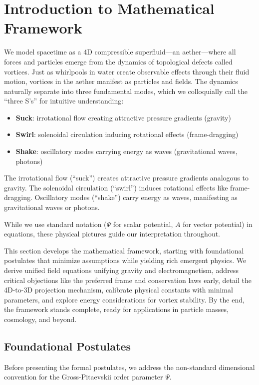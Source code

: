 \section{Introduction to Mathematical Framework}

We model spacetime as a 4D compressible superfluid---an aether---where all forces and particles emerge from the dynamics of topological defects called vortices. Just as whirlpools in water create observable effects through their fluid motion, vortices in the aether manifest as particles and fields. The dynamics naturally separate into three fundamental modes, which we colloquially call the ``three S's'' for intuitive understanding:
\begin{itemize}
\item \textbf{Suck}: irrotational flow creating attractive pressure gradients (gravity)
\item \textbf{Swirl}: solenoidal circulation inducing rotational effects (frame-dragging)
\item \textbf{Shake}: oscillatory modes carrying energy as waves (gravitational waves, photons)
\end{itemize}
The irrotational flow (``suck'') creates attractive pressure gradients analogous to gravity. The solenoidal circulation (``swirl'') induces rotational effects like frame-dragging. Oscillatory modes (``shake'') carry energy as waves, manifesting as gravitational waves or photons.

While we use standard notation ($\Psi$ for scalar potential, $A$ for vector potential) in equations, these physical pictures guide our interpretation throughout.

This section develops the mathematical framework, starting with foundational postulates that minimize assumptions while yielding rich emergent physics. We derive unified field equations unifying gravity and electromagnetism, address critical objections like the preferred frame and conservation laws early, detail the 4D-to-3D projection mechanism, calibrate physical constants with minimal parameters, and explore energy considerations for vortex stability. By the end, the framework stands complete, ready for applications in particle masses, cosmology, and beyond.

\subsection{Foundational Postulates}

Before presenting the formal postulates, we address the non-standard dimensional convention for the Gross-Pitaevskii order parameter $\Psi$.

